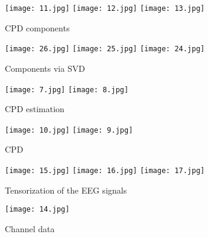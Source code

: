\begin{figure}[!htbp]
%
\centering
\texttt{[image: 11.jpg]}
\endminipage\hfill
{}%
\centering
\texttt{[image: 12.jpg]}
\endminipage\hfill
{}%
\centering
\texttt{[image: 13.jpg]}
\endminipage\hfill
\caption{CPD components}\label{a15}
\end{figure}

\begin{figure}[!htbp]
%
\centering
\texttt{[image: 26.jpg]}
\endminipage\hfill
{}%
\centering
\texttt{[image: 25.jpg]}
\endminipage\hfill
{}%
\centering
\texttt{[image: 24.jpg]}
\endminipage\hfill
\caption{Components via SVD}\label{A1}
\end{figure}


\begin{figure}[!htbp]
%
\centering
\texttt{[image: 7.jpg]}
\label{a13}
\endminipage\hfill
{}%
\centering
\texttt{[image: 8.jpg]}
\label{a14}
\endminipage\hfill
\caption{CPD estimation}
\end{figure}




\begin{figure}[!htbp]
%
\centering
\texttt{[image: 10.jpg]}
\label{a11}
\endminipage\hfill
{}%
\centering
\texttt{[image: 9.jpg]}
\label{a12}
\endminipage\hfill
\caption{CPD}
\end{figure}

\begin{figure}[!htbp]
%
\centering
\texttt{[image: 15.jpg]}
\endminipage\hfill
{}%
\centering
\texttt{[image: 16.jpg]}
\endminipage\hfill
{}%
\centering
\texttt{[image: 17.jpg]}
\endminipage\hfill
\caption{Tensorization of the EEG signals}\label{a16}
\end{figure}

\begin{figure}[!htbp]
\centering
\texttt{[image: 14.jpg]}
\caption{Channel data}\label{a17}

\end{figure}


